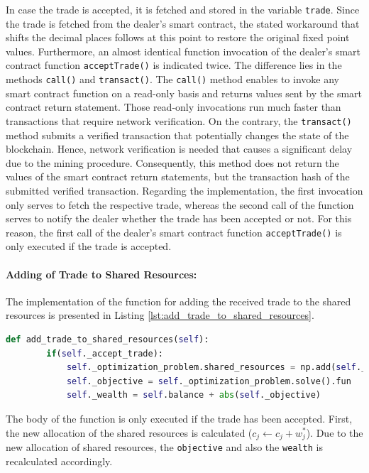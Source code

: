 In case the trade is accepted, it is fetched and stored in the variable \verb|trade|. Since the trade 
is fetched from the dealer's smart contract, the stated workaround that shifts the decimal places follows
at this point to restore the original fixed point values.
Furthermore, an almost identical function invocation of the dealer's smart contract 
function \verb|acceptTrade()| is indicated twice. 
The difference lies in the methods \verb|call()| and \verb|transact()|. 
The \verb|call()| method enables to invoke any smart contract function on a read-only basis
and returns values sent by the smart contract return statement. 
Those read-only invocations run much faster than transactions that require network verification.
On the contrary, the \verb|transact()| method submits a verified transaction that potentially changes the state of the blockchain. 
Hence, network verification is needed that causes a significant delay due to the mining procedure.
Consequently, this method does not return the values of the smart contract return statements,
but the transaction hash of the submitted verified transaction.
Regarding the implementation, the first invocation only serves to fetch the respective trade,
whereas the second call of the function serves to notify the dealer whether the trade has been accepted or not.
For this reason, the first call of the dealer's smart contract function \verb|acceptTrade()| 
is only executed if the trade is accepted. 

\paragraph{Adding of Trade to Shared Resources:} The implementation of the function for adding the received trade to the shared resources is presented 
in Listing \ref{lst:add_trade_to_shared_resources}.

\begin{lstlisting}[float=htbp, label=lst:add_trade_to_shared_resources, caption=Adding of Trade to Shared Resources, language=Python]
    def add_trade_to_shared_resources(self):
        if(self._accept_trade):
            self._optimization_problem.shared_resources = np.add(self._optimization_problem.shared_resources, self._trade)
            self._objective = self._optimization_problem.solve().fun  
            self._wealth = self.balance + abs(self._objective)
\end{lstlisting}

The body of the function is only executed if the trade has been accepted.
First, the new allocation of the shared resources is calculated ($c_{j} \leftarrow c_{j} + w_{j}^{*}$).
Due to the new allocation of shared resources, the \verb|objective| and also the \verb|wealth| is recalculated accordingly.


